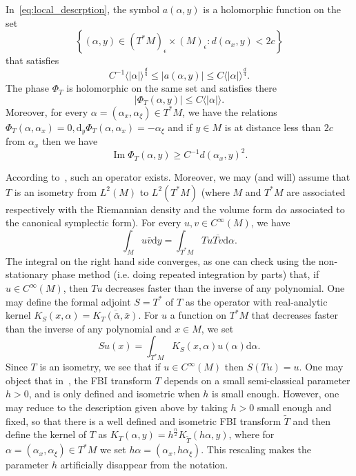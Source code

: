 \documentclass[AHL,Unicode,longabstracts,published]{cedram}
\DeclareMathOperator{\im}{Im}
\newcommand{\set}[1]{\left\{ #1 \right\}}
\newcommand{\va}[1]{\left|#1\right|}
\newcommand{\brac}[1]{\langle #1 \rangle}
\newcommand{\rmd}{\mathrm{d}}
\begin{document}
In~\eqref{eq:local_descrption}, the symbol $a(\alpha,y)$ is a holomorphic function on the set
\[
\set{ (\alpha,y) \in (T^* M)_\epsilon \times (M)_\epsilon: d(\alpha_x,y) < 2c}
\]
that satisfies
\begin{equation*}
C^{-1} \brac{\va{\alpha}}^{\frac{d}{4}} \leq \va{a(\alpha,y)} \leq C \brac{\va{\alpha}}^{\frac{d}{4}}.
\end{equation*}
The phase $\Phi_T$ is holomorphic on the same set and satisfies there
\begin{equation}\label{eq:control_phase}
\va{\Phi_T(\alpha,y)} \leq C \brac{\va{\alpha}}.
\end{equation}
Moreover, for every $\alpha = (\alpha_x,\alpha_\xi) \in T^* M$, we have the relations $\Phi_T(\alpha,\alpha_x) = 0, \rmd _y \Phi_T(\alpha,\alpha_x)= - \alpha_\xi$ and if $y \in M$ is at distance less than $2c$ from $\alpha_x$ then we have
\begin{equation}\label{eq:coercivity_phase}
\im \Phi_T(\alpha,y) \geq C^{-1} d(\alpha_x,y)^2.
\end{equation}

According to~\cite[Theorem~6]{BJ20}, such an operator exists. Moreover, we may (and will) assume that $T$ is an isometry from $L^2(M)$ to $L^2(T^* M)$ (where $M$ and $T^* M$ are associated respectively with the Riemannian density and the volume form $\rmd \alpha$ associated to the canonical symplectic form). For every $u,v \in C^\infty(M)$, we have
\begin{equation*}
\int_M u \bar{v} \rmd y = \int_{T^* M} Tu \overline{T v} \rmd \alpha.
\end{equation*}
The integral on the right hand side converges, as one can check using the non-stationary phase method (i.e. doing repeated integration by parts) that, if $u \in C^\infty(M)$, then $Tu$ decreases faster than the inverse of any polynomial. One may define the formal adjoint $S = T^*$ of $T$ as the operator with real-analytic kernel $K_S(x,\alpha) = \overline{K_T(\bar{\alpha},\bar{x})}$. For $u$ a function on $T^* M$ that decreases faster than the inverse of any polynomial and $x \in M$, we set
\begin{equation*}
S u (x) = \int_{T^* M} K_S(x,\alpha) u(\alpha) \rmd \alpha.
\end{equation*}
Since $T$ is an isometry, we see that if $u \in C^\infty(M)$ then $S(Tu) = u$. One may object that in~\cite{BJ20}, the FBI transform $T$ depends on a small semi-classical parameter $h > 0$, and is only defined and isometric when $h$ is small enough. However, one may reduce to the description given above by taking $h > 0$ small enough and fixed, so that there is a well defined and isometric FBI transform $\widetilde{T}$ and then define the kernel of $T$ as $K_T(\alpha,y) = h^{\frac{n}{2}} K_{\widetilde{T}}(h\alpha,y)$, where for $\alpha = (\alpha_x,\alpha_\xi) \in T^* M$ we set $h \alpha = (\alpha_x,h \alpha_\xi)$. This rescaling makes the parameter $h$ artificially disappear from the notation.
\end{document}
